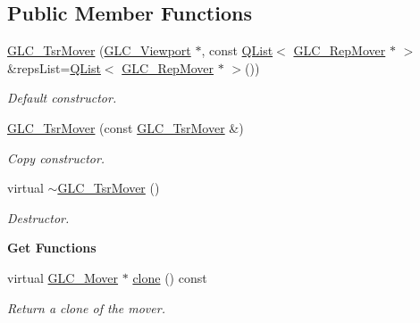 \subsection*{Public Member Functions}
\begin{DoxyCompactItemize}
\item 
\hyperlink{class_g_l_c___tsr_mover_ab4131b8f60fc97da66961c730523516f}{G\-L\-C\-\_\-\-Tsr\-Mover} (\hyperlink{class_g_l_c___viewport}{G\-L\-C\-\_\-\-Viewport} $\ast$, const \hyperlink{class_q_list}{Q\-List}$<$ \hyperlink{class_g_l_c___rep_mover}{G\-L\-C\-\_\-\-Rep\-Mover} $\ast$ $>$ \&reps\-List=\hyperlink{class_q_list}{Q\-List}$<$ \hyperlink{class_g_l_c___rep_mover}{G\-L\-C\-\_\-\-Rep\-Mover} $\ast$ $>$())
\begin{DoxyCompactList}\small\item\em Default constructor. \end{DoxyCompactList}\item 
\hyperlink{class_g_l_c___tsr_mover_a90db0c9cc6ac0d26b6f5fe45cca3abea}{G\-L\-C\-\_\-\-Tsr\-Mover} (const \hyperlink{class_g_l_c___tsr_mover}{G\-L\-C\-\_\-\-Tsr\-Mover} \&)
\begin{DoxyCompactList}\small\item\em Copy constructor. \end{DoxyCompactList}\item 
virtual \hyperlink{class_g_l_c___tsr_mover_af93c2630ebf900a2bbae77c169605f9b}{$\sim$\-G\-L\-C\-\_\-\-Tsr\-Mover} ()
\begin{DoxyCompactList}\small\item\em Destructor. \end{DoxyCompactList}\end{DoxyCompactItemize}
\begin{Indent}{\bf Get Functions}\par
\begin{DoxyCompactItemize}
\item 
virtual \hyperlink{class_g_l_c___mover}{G\-L\-C\-\_\-\-Mover} $\ast$ \hyperlink{class_g_l_c___tsr_mover_aa8acd6c2eb498b7de90894f3683ebb06}{clone} () const 
\begin{DoxyCompactList}\small\item\em Return a clone of the mover. \end{DoxyCompactList}\end{DoxyCompactItemize}
\end{Indent}
